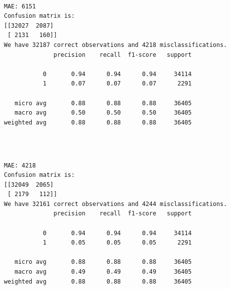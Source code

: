 \documentclass[8pt,onecolumn,aps,pra]{revtex4-1}
\begin{document}
    \begin{center}
    \end{center}
    { \hspace*{\fill} \\}
    
    \begin{Verbatim}[commandchars=\\\{\}]
MAE: 6151
Confusion matrix is:
[[32027  2087]
 [ 2131   160]]
We have 32187 correct observations and 4218 misclassifications.
              precision    recall  f1-score   support

           0       0.94      0.94      0.94     34114
           1       0.07      0.07      0.07      2291

   micro avg       0.88      0.88      0.88     36405
   macro avg       0.50      0.50      0.50     36405
weighted avg       0.88      0.88      0.88     36405


    \end{Verbatim}

    \begin{center}
    \end{center}
    { \hspace*{\fill} \\}
    
    \begin{Verbatim}[commandchars=\\\{\}]
MAE: 4218
Confusion matrix is:
[[32049  2065]
 [ 2179   112]]
We have 32161 correct observations and 4244 misclassifications.
              precision    recall  f1-score   support

           0       0.94      0.94      0.94     34114
           1       0.05      0.05      0.05      2291

   micro avg       0.88      0.88      0.88     36405
   macro avg       0.49      0.49      0.49     36405
weighted avg       0.88      0.88      0.88     36405


    \end{Verbatim}

    \begin{center}
    \end{center}
    { \hspace*{\fill} \\}
    
\end{document}

